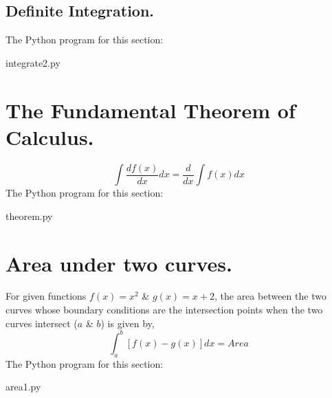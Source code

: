 \documentclass{article}
\begin{document}
\subsection{Definite Integration.}
The Python program for this section:

{integrate2.py}

\newpage
\section{The Fundamental Theorem of Calculus.}
\begin{equation}
\int \frac{d f(x)}{dx} dx = \frac{d}{dx}\int f(x)dx
\end{equation}
The Python program for this section:

{theorem.py}

\newpage
\section{Area under two curves.}
For given functions $f(x)=x^{2}$ \& $g(x)=x+2$, the area between the two curves whose boundary conditions are the intersection points when the two curves intersect ($a$ \& $b$) is given by,  
\begin{equation}
\int_{a}^{b}[f(x)-g(x)] dx = Area
\end{equation}
The Python program for this section:

{area1.py}
\end{document}
